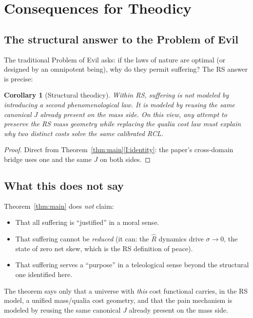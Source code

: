 \documentclass[11pt,a4paper]{article}
\theoremstyle{plain}
\newtheorem{corollary}[theorem]{Corollary}
\theoremstyle{definition}
\theoremstyle{remark}
\newcommand{\Jcost}{J}
\newcommand{\Rhat}{\hat{R}}
\begin{document}
\section{Consequences for Theodicy}
\label{sec:theodicy}

\subsection{The structural answer to the Problem of Evil}

The traditional Problem of Evil asks: if the laws of nature are
optimal (or designed by an omnipotent being), why do they permit
suffering?  The RS answer is precise:

\begin{corollary}[Structural theodicy]
\label{cor:theodicy}
Within RS, suffering is not modeled by introducing a second
phenomenological law.  It is modeled by reusing the same canonical
$\Jcost$ already present on the mass side.  On this view, any attempt
to preserve the RS mass geometry while replacing the qualia cost law
must explain why two distinct costs solve the same calibrated RCL.
\end{corollary}

\begin{proof}
Direct from Theorem~\ref{thm:main}\ref{I:identity}: the paper's
cross-domain bridge uses one and the same $\Jcost$ on both sides.
\end{proof}

\subsection{What this does not say}

Theorem~\ref{thm:main} does \emph{not} claim:
\begin{itemize}[nosep]
\item That all suffering is ``justified'' in a moral sense.
\item That suffering cannot be \emph{reduced} (it can: the
      $\Rhat$ dynamics drive $\sigma \to 0$, the state of
      zero net skew, which is the RS definition of peace).
\item That suffering serves a ``purpose'' in a teleological
      sense beyond the structural one identified here.
\end{itemize}
The theorem says only that a universe with \emph{this} cost
functional carries, in the RS model, a unified mass/qualia cost
geometry, and that the pain mechanism is modeled by reusing the same
canonical $\Jcost$ already present on the mass side.
\end{document}
